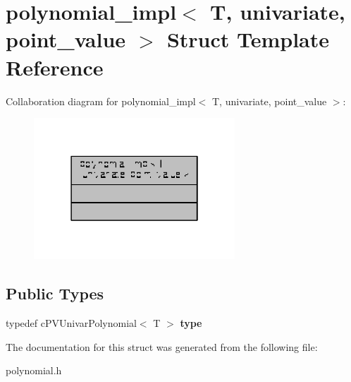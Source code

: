 \hypertarget{structpolynomial__impl_3_01T_00_01univariate_00_01point__value_01_4}{\section{polynomial\-\_\-impl$<$ T, univariate, point\-\_\-value $>$ Struct Template Reference}
\label{structpolynomial__impl_3_01T_00_01univariate_00_01point__value_01_4}
}


Collaboration diagram for polynomial\-\_\-impl$<$ T, univariate, point\-\_\-value $>$\-:
\nopagebreak
\begin{figure}[H]
\begin{center}
\leavevmode
\includegraphics[width=214pt]{structpolynomial__impl_3_01T_00_01univariate_00_01point__value_01_4__coll__graph}
\end{center}
\end{figure}
\subsection*{Public Types}
\begin{DoxyCompactItemize}
\item 
\hypertarget{structpolynomial__impl_3_01T_00_01univariate_00_01point__value_01_4_a83fba15a86add8b4b76e568c37e366b6}{typedef c\-P\-V\-Univar\-Polynomial$<$ T $>$ {\bfseries type}}\label{structpolynomial__impl_3_01T_00_01univariate_00_01point__value_01_4_a83fba15a86add8b4b76e568c37e366b6}

\end{DoxyCompactItemize}


The documentation for this struct was generated from the following file\-:\begin{DoxyCompactItemize}
\item 
polynomial.\-h\end{DoxyCompactItemize}
